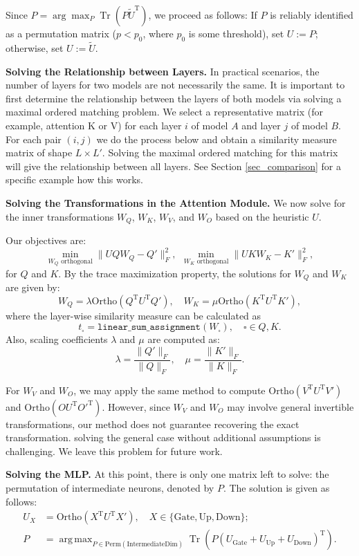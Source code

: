 \documentclass{article} %
\DeclareMathOperator*{\argmax}{arg\,max}
\DeclareMathOperator{\Tr}{Tr}
\begin{document}
Since $P = \arg\max_P \Tr(P \tilde{U}^{\text{T}})$, we proceed as follows:  
If $P$ is reliably identified as a permutation matrix ($p < p_0$, where $p_0$ is some threshold), set $U := P$; otherwise, set $U := \tilde{U}$. 



\textbf{Solving the Relationship between Layers.}
In practical scenarios, the number of layers for two models are not necessarily the same. 
It is important to first determine the relationship between the layers of both models via solving a maximal ordered matching problem.
We select a representative matrix (for example, attention K or V) for each layer $i$ of model $A$ and layer $j$ of model $B$.
For each pair $(i,j)$ we do the process below and obtain a similarity measure matrix of shape $L \times L'$. 
Solving the maximal ordered matching for this matrix will give the relationship between all layers. See Section \ref{sec_comparison}
for a specific example how this works.


\textbf{Solving the Transformations in the Attention Module.}  
We now solve for the inner transformations $W_Q$, $W_K$, $W_V$, and $W_O$ based on the heuristic $U$.  

Our objectives are:
\[
\min_{W_Q \text{ orthogonal}} \lVert U Q W_Q - Q' \rVert_F^2, \ \  \min_{W_K \text{ orthogonal}} \lVert U K W_K - K' \rVert_F^2,
\]
for $Q$ and $K$. By the trace maximization property, the solutions for $W_Q$ and $W_K$ are given by:
\[
W_Q = \lambda \mathrm{Ortho}(Q^{\text{T}} U^{\text{T}} Q'), \quad W_K = \mu \mathrm{Ortho}(K^{\text{T}} U^{\text{T}} K'),
\]
where the layer-wise similarity measure can be calculated as
\[ t_\square = \texttt{linear\_sum\_assignment}(W_\square), \quad \square \in Q, K.\]
Also, scaling coefficients $\lambda$ and $\mu$ are computed as:
\[
\lambda = \frac{\lVert Q' \rVert_F}{\lVert Q \rVert_F}, \quad \mu = \frac{\lVert K' \rVert_F}{\lVert K \rVert_F}.
\]

For $W_V$ and $W_O$,  
we may apply the same method to compute $\mathrm{Ortho}(V^{\text{T}} U^{\text{T}} V')$ and $\mathrm{Ortho}(O U^{\text{T}} O'^{\text{T}})$.  
However, since $W_V$ and $W_O$ may involve general invertible transformations, our method does not guarantee recovering the exact transformation.
solving the general case without additional assumptions is challenging.  
We leave this problem for future work.

\textbf{Solving the MLP.}  
At this point, there is only one matrix left to solve: the permutation of intermediate neurons, denoted by $P$.  
The solution is given as follows:
\[
\begin{aligned}
U_X &= \mathrm{Ortho}(X^{\text{T}} U^{\text{T}} X'), \quad X \in \{\mathrm{Gate}, \mathrm{Up}, \mathrm{Down}\}; \\
P &= \argmax_{P \in \mathrm{Perm}(\mathrm{IntermediateDim})} \Tr \left( P \left( U_{\mathrm{Gate}} + U_{\mathrm{Up}} + U_{\mathrm{Down}} \right)^{\text{T}} \right).
\end{aligned}
\]
\end{document}
